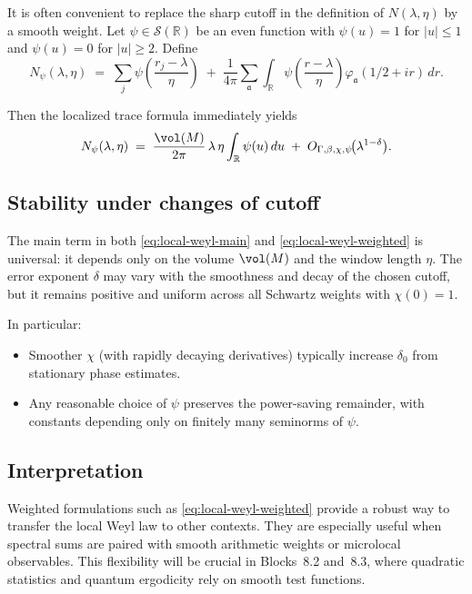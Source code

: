 It is often convenient to replace the sharp cutoff in the definition of $N(\lambda,\eta)$ by a smooth weight. Let $\psi\in\mathcal{S}(\mathbb{R})$ be an even function with $\psi(u)=1$ for $|u|\le 1$ and $\psi(u)=0$ for $|u|\ge 2$. Define
\[
N_\psi(\lambda,\eta)\;=\;\sum_j \psi\!\left(\frac{r_j-\lambda}{\eta}\right)
\;+\;\frac{1}{4\pi}\sum_{\mathfrak{a}} \int_{\mathbb{R}}
\psi\!\left(\frac{r-\lambda}{\eta}\right)\varphi_\mathfrak{a}(1/2+ir)\,dr.
\]

Then the localized trace formula immediately yields
\begin{equation}\label{eq:local-weyl-weighted}
N_\psi(\lambda,\eta)
\;=\;\frac{\vol(M)}{2\pi}\,\lambda\,\eta \int_{\mathbb{R}}\psi(u)\,du
\;+\; O_{\Gamma,\beta,\chi,\psi}\!\big(\lambda^{1-\delta}\big).
\end{equation}

\subsection{Stability under changes of cutoff}

The main term in both \eqref{eq:local-weyl-main} and \eqref{eq:local-weyl-weighted} is universal: it depends only on the volume $\vol(M)$ and the window length $\eta$. The error exponent $\delta$ may vary with the smoothness and decay of the chosen cutoff, but it remains positive and uniform across all Schwartz weights with $\chi(0)=1$.

In particular:
\begin{itemize}
  \item Smoother $\chi$ (with rapidly decaying derivatives) typically increase $\delta_0$ from stationary phase estimates.
  \item Any reasonable choice of $\psi$ preserves the power-saving remainder, with constants depending only on finitely many seminorms of $\psi$.
\end{itemize}

\subsection{Interpretation}

Weighted formulations such as \eqref{eq:local-weyl-weighted} provide a robust way to transfer the local Weyl law to other contexts. They are especially useful when spectral sums are paired with smooth arithmetic weights or microlocal observables. This flexibility will be crucial in Blocks~8.2 and~8.3, where quadratic statistics and quantum ergodicity rely on smooth test functions.

